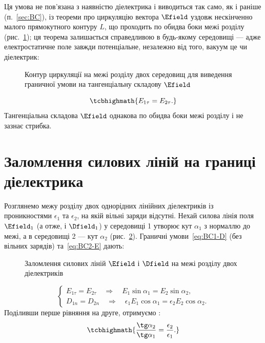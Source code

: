  Ця умова не пов'язана з наявністю діелектрика і виводиться так само, як і
раніше (п.~\ref{sec:BC}), із теореми про циркуляцію вектора $\Efield$ уздовж нескінченно малого прямокутного контуру $L$, що проходить по обидва боки
межі розділу (рис.~\ref{pic:BC2}); ця теорема залишається справедливою в будь-якому середовищі --- адже електростатичне
поле завжди потенціальне, незалежно від того, вакуум це чи діелектрик:

\begin{figure}[h!]\centering
	\caption{Контур циркуляції на межі розділу двох середовищ для виведення граничної умови на
		тангенціальну складову $\Efield$\label{pic:BC2}}
\end{figure}
\begin{equation}\label{eq:BC2-E}
	\tcbhighmath{
		E_{1\tau} = E_{2\tau}.
	}
\end{equation}
Тангенціальна складова $\Efield$ однакова по обидва боки межі розділу і не зазнає стрибка.

\section{Заломлення силових ліній на границі діелектрика}

Розглянемо межу розділу двох однорідних лінійних діелектриків із проникностями $\epsilon_1$ та $\epsilon_2$, на якій вільні заряди відсутні. Нехай
силова лінія поля $\Efield_1$ (а отже, і $\Dfield_1$) у середовищі 1 утворює кут $\alpha_1$ з нормаллю до межі, а в середовищі 2 --- кут $\alpha_2$
(рис.~\ref{pic:Refraction}).
Граничні умови~\eqref{eq:BC1-D} (без вільних зарядів) та~\eqref{eq:BC2-E} дають:

\begin{figure}[h!]\centering
	\caption{Заломлення силових ліній $\Efield$ і $\Dfield$ на межі розділу двох
		діелектриків\label{pic:Refraction}}
\end{figure}
\begin{equation*}
	\begin{cases}
		E_{1\tau} = E_{2\tau} \quad\Longrightarrow\quad E_1\sin\alpha_1 = E_2\sin\alpha_2, \\
		D_{1n} = D_{2n} \quad\Longrightarrow\quad \epsilon_1 E_1\cos\alpha_1 = \epsilon_2 E_2\cos\alpha_2.
	\end{cases}
\end{equation*}
Поділивши перше рівняння на друге, отримуємо :
\begin{equation}\label{eq:Refraction}
	\tcbhighmath{
		\frac{\tg\alpha_2}{\tg\alpha_1} = \frac{\epsilon_2}{\epsilon_1}.
	}
\end{equation}

